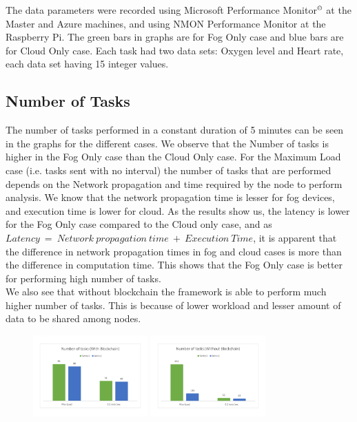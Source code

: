 \documentclass[10pt,journal,compsoc]{IEEEtran}
\begin{document}
The data parameters were recorded using Microsoft Performance Monitor$^\copyright$ at the Master and Azure machines, and using NMON Performance Monitor at the Raspberry Pi. The green bars in graphs are for Fog Only case and blue bars are for Cloud Only case. Each task had two data sets: Oxygen level and Heart rate, each data set having 15 integer values.

\subsection{Number of Tasks}

The number of tasks performed in a constant duration of 5 minutes can be seen in the graphs for the different cases. We observe that the Number of tasks is higher in the Fog Only case than the Cloud Only case. For the Maximum Load case (i.e. tasks sent with no interval) the number of tasks that are performed depends on the Network propagation and time required by the node to perform analysis. We know that the network propagation time is lesser for fog devices, and execution time is lower for cloud. As the results show us, the latency is lower for the Fog Only case compared to the Cloud only case, and as $Latency\ =\ Network\ propagation\ time\ +\ Execution\ Time$, it is apparent that the difference in network propagation times in fog and cloud cases is more than the difference in computation time. This shows that the Fog Only case is better for performing high number of tasks.\\
We also see that without blockchain the framework is able to perform much higher number of tasks. This is because of lower workload and lesser amount of data to be shared among nodes.
\begin{figure}[h]
\centering
\includegraphics[width=4.4cm]{g11}
\includegraphics[width=4.4cm]{g12}
\end{figure}
\end{document}

